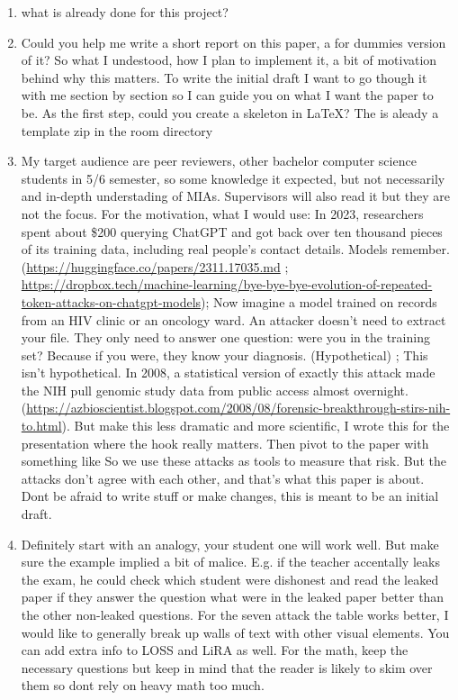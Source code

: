 \documentclass[a4paper]{article}
\newcommand{\prompt}[1]{{\raggedright\small\ttfamily\frenchspacing #1\par}}
\begin{document}
\begin{enumerate}
  \item \prompt{what is already done for this project?}
  \item \prompt{Could you help me write a short report on this paper, a \textquotedbl{}for dummies\textquotedbl{} version of it? So what I undestood, how I plan to implement it, a bit of motivation behind why this matters. To write the initial draft I want to go though it with me section by section so I can guide you on what I want the paper to be. As the first step, could you create a skeleton in LaTeX? The is aleady a template zip in the room directory}
  \item \prompt{My target audience are peer reviewers, other bachelor computer science students in 5/6 semester, so some knowledge it expected, but not necessarily and in-depth understading of MIAs. Supervisors will also read it but they are not the focus. For the motivation, what I would use: \textquotedbl{}In 2023, researchers spent about \$200 querying ChatGPT and got back over ten thousand pieces of its training data, including real people's contact details. Models remember.\textquotedbl{} (\url{https://huggingface.co/papers/2311.17035.md} ; \url{https://dropbox.tech/machine-learning/bye-bye-bye-evolution-of-repeated-token-attacks-on-chatgpt-models}); \textquotedbl{}Now imagine a model trained on records from an HIV clinic or an oncology ward. An attacker doesn't need to extract your file. They only need to answer one question: were you in the training set? Because if you were, they know your diagnosis.\textquotedbl{} (Hypothetical) ; \textquotedbl{}This isn't hypothetical. In 2008, a statistical version of exactly this attack made the NIH pull genomic study data from public access almost overnight.\textquotedbl{} (\url{https://azbioscientist.blogspot.com/2008/08/forensic-breakthrough-stirs-nih-to.html}). But make this less dramatic and more scientific, I wrote this for the presentation where the hook really matters. Then pivot to the paper with something like \textquotedbl{}So we use these attacks as tools to measure that risk. But the attacks don't agree with each other, and that's what this paper is about.\textquotedbl{} Dont be afraid to write stuff or make changes, this is meant to be an initial draft.}
  \item \prompt{Definitely start with an analogy, your student one will work well. But make sure the example implied a bit of malice. E.g. if the teacher \textquotedbl{}accentally\textquotedbl{} leaks the exam, he could check which student were dishonest and read the \textquotedbl{}leaked\textquotedbl{} paper if they answer the question what were in the \textquotedbl{}leaked\textquotedbl{} paper better than the other non-leaked questions. For the seven attack the table works better, I would like to generally break up walls of text with other visual elements. You can add extra info to LOSS and LiRA as well. For the math, keep the necessary questions but keep in mind that the reader is likely to skim over them so dont rely on heavy math too much.}

\end{enumerate}
\end{document}
